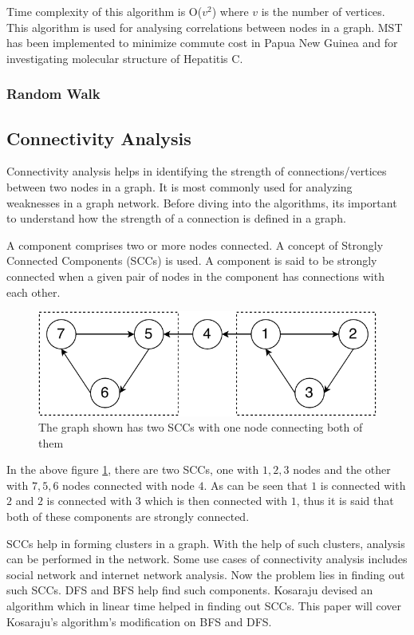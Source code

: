 \documentclass[journal,twoside,web]{ieeecolor}
\begin{document}
Time complexity of this algorithm is O($v^2$) where $v$ is the number of vertices. This algorithm is used for analysing correlations between nodes in a graph. MST has been implemented to minimize commute cost in Papua New Guinea\cite{13} and for investigating molecular structure of Hepatitis C\cite{50}.

\subsubsection{Random Walk}

\subsection{Connectivity Analysis}
Connectivity analysis helps in identifying the strength of connections/vertices between two nodes in a graph. It is most commonly used for analyzing weaknesses in a graph network. Before diving into the algorithms, its important to understand how the strength of a connection is defined in a graph.

A component comprises two or more nodes connected. A concept of Strongly Connected Components (SCCs)\cite{39} is used. A component is said to be strongly connected when a given pair of nodes in the component has connections with each other.

\begin{figure}[!h]
    \centerline{\includegraphics[scale=0.75]{figures/scc.pdf}}
    \caption{The graph shown has two SCCs with one node connecting both of them}
    \label{fig4}
\end{figure}

In the above figure \ref{fig4}, there are two SCCs, one with {$1, 2, 3$} nodes and the other with {$7, 5, 6$} nodes connected with node $4$. As can be seen that $1$ is connected with $2$ and $2$ is connected with $3$ which is then connected with $1$, thus it is said that both of these components are strongly connected.

SCCs help in forming clusters in a graph. With the help of such clusters, analysis can be performed in the network. Some use cases of connectivity analysis includes social network and internet network analysis. Now the problem lies in finding out such SCCs. DFS and BFS help find such components. Kosaraju devised an algorithm which in linear time helped in finding out SCCs\cite{40}. This paper will cover Kosaraju's algorithm's modification on BFS and DFS.
\end{document}
